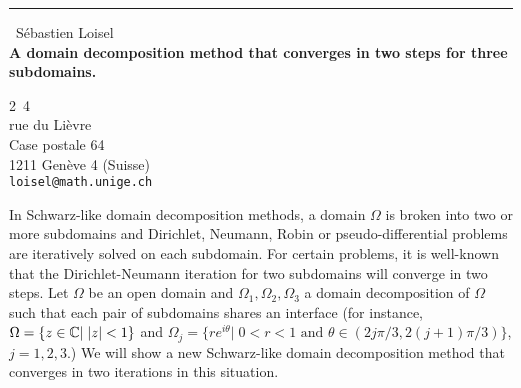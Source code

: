 \documentclass{report}
\begin{document}
\begin{center}
\rule{6in}{1pt} \
{\large S\'ebastien Loisel \\
{\bf A domain decomposition method that converges in two steps for three subdomains.}}

2~4 \\ rue du Li\`evre \\ Case postale 64 \\ 1211 Gen\`eve 4 (Suisse)
\\
{\tt loisel@math.unige.ch}\end{center}

In Schwarz-like domain decomposition methods, a domain $\Omega$ is
broken into two or more subdomains and Dirichlet, Neumann, Robin or
pseudo-differential problems are iteratively solved on each subdomain.
For certain problems, it is well-known that the Dirichlet-Neumann
iteration for two subdomains will converge in two steps. Let $\Omega$
be an open domain and $\Omega_{1},\Omega_{2},\Omega_{3}$ a domain
decomposition of $\Omega$ such that each pair of subdomains shares
an interface (for instance, $\Omega=\{ z\in\Bbb C|\;|z|<1\}$ and
$\Omega_{j}=\{ re^{i\theta}|\;0<r<1\textrm{ and }\theta\in(2j\pi/3,2(j+1)\pi/3)\}$,
$j=1,2,3$.) We will show a new Schwarz-like domain decomposition
method that converges in two iterations in this situation.
\end{document}
